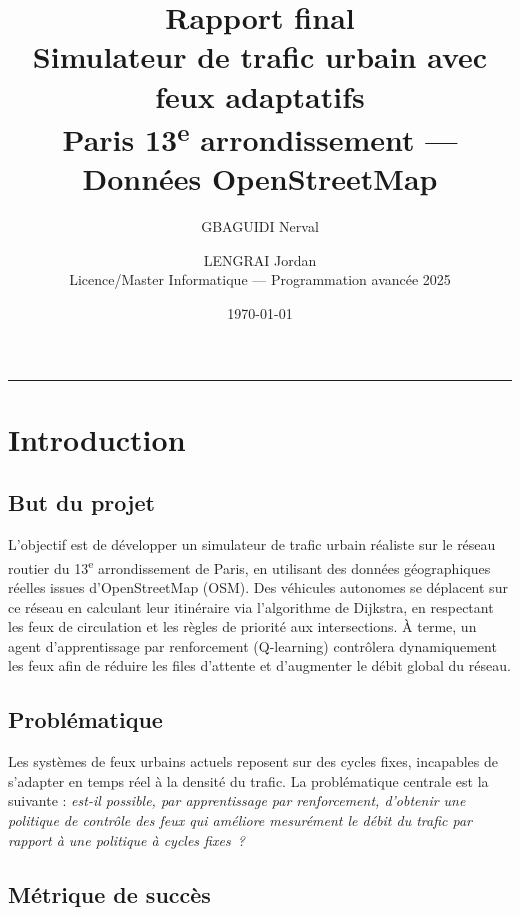 \documentclass[a4paper,10pt]{article}
\title{\textbf{Rapport final}\\
       \large Simulateur de trafic urbain avec feux adaptatifs\\
       \normalsize Paris 13\textsuperscript{e} arrondissement
       --- Donn\'{e}es OpenStreetMap}
\author{GBAGUIDI Nerval \and LENGRAI Jordan\\
        \small Licence/Master Informatique --- Programmation avanc\'{e}e 2025}
\date{\today}
\begin{document}
\maketitle
\thispagestyle{empty}
\vspace{-0.6em}\hrule\vspace{0.4em}

\section{Introduction}

\subsection{But du projet}

L'objectif est de d\'{e}velopper un simulateur de trafic urbain r\'{e}aliste
sur le r\'{e}seau routier du 13\textsuperscript{e} arrondissement de Paris,
en utilisant des donn\'{e}es g\'{e}ographiques r\'{e}elles issues d'OpenStreetMap (OSM).
Des v\'{e}hicules autonomes se d\'{e}placent sur ce r\'{e}seau en calculant leur
itin\'{e}raire via l'algorithme de Dijkstra, en respectant les feux de
circulation et les r\`{e}gles de priorit\'{e} aux intersections.
\`{A} terme, un agent d'apprentissage par renforcement (Q-learning)
contr\^{o}lera dynamiquement les feux afin de r\'{e}duire les files d'attente
et d'augmenter le d\'{e}bit global du r\'{e}seau.

\subsection{Probl\'{e}matique}

Les syst\`{e}mes de feux urbains actuels reposent sur des cycles fixes,
incapables de s'adapter en temps r\'{e}el \`{a} la densit\'{e} du trafic.
La probl\'{e}matique centrale est la suivante :
\textit{est-il possible, par apprentissage par renforcement, d'obtenir
une politique de contr\^{o}le des feux qui am\'{e}liore mesur\'{e}ment le d\'{e}bit
du trafic par rapport \`{a} une politique \`{a} cycles fixes~?}

\subsection{M\'{e}trique de succ\`{e}s}
\end{document}
